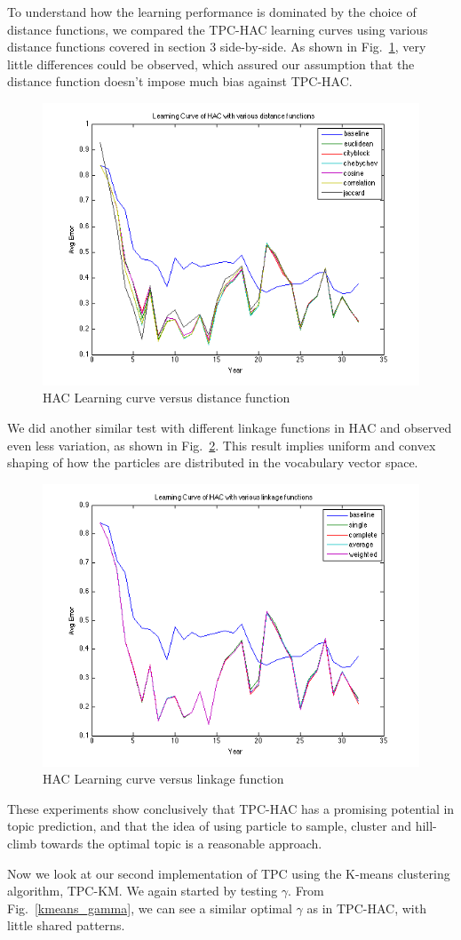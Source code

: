 \documentclass[conference]{IEEEtran}
\begin{document}
To understand how the learning performance is dominated by the choice of distance functions, we compared the TPC-HAC learning curves using various distance functions covered in section 3 side-by-side. As shown in Fig.~\ref{hac_dist}, very little differences could be observed, which assured our assumption that the distance function doesn't impose much bias against TPC-HAC.

\begin{figure}[h]
	\center
	\includegraphics[width=.50\textwidth]{fig/hac_dist.png}
	\caption{HAC Learning curve versus distance function}
	\label{hac_dist}
\end{figure}

We did another similar test with different linkage functions in HAC and observed even less variation, as shown in Fig.~\ref{hac_link}. This result implies uniform and convex shaping of how the particles are distributed in the vocabulary vector space.

\begin{figure}[h]
	\center
	\includegraphics[width=.50\textwidth]{fig/hac_link.png}
	\caption{HAC Learning curve versus linkage function}
	\label{hac_link}
\end{figure}

These experiments show conclusively that TPC-HAC has a promising potential in topic prediction, and that the idea of using particle to sample, cluster and hill-climb towards the optimal topic is a reasonable approach.

Now we look at our second implementation of TPC using the K-means clustering algorithm, TPC-KM. We again started by testing $\gamma$. From Fig.~\ref{kmeans_gamma}, we can see a similar optimal $\gamma$ as in TPC-HAC, with little shared patterns.
\end{document}
